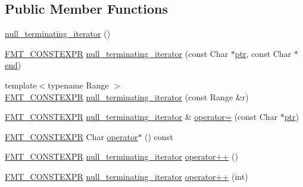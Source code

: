 \subsection*{Public Member Functions}
\begin{DoxyCompactItemize}
\item 
\hyperlink{classinternal_1_1null__terminating__iterator_a2c85bbc62dfa178fbe579df6933a70c4}{null\+\_\+terminating\+\_\+iterator} ()
\item 
\hyperlink{core_8h_a69201cb276383873487bf68b4ef8b4cd}{F\+M\+T\+\_\+\+C\+O\+N\+S\+T\+E\+X\+PR} \hyperlink{classinternal_1_1null__terminating__iterator_ab425ad7f2b63584fe73ceb38535f434c}{null\+\_\+terminating\+\_\+iterator} (const Char $\ast$\hyperlink{format_8h_ae6bfbee71e8bd00280b2d936f93f7b88}{ptr}, const Char $\ast$\hyperlink{namespaceinternal_a94820de1710dc8038fa6f188adfe299b}{end})
\item 
{\footnotesize template$<$typename Range $>$ }\\\hyperlink{core_8h_a69201cb276383873487bf68b4ef8b4cd}{F\+M\+T\+\_\+\+C\+O\+N\+S\+T\+E\+X\+PR} \hyperlink{classinternal_1_1null__terminating__iterator_a791a9850a8ccc184bb925f84ccaafb5e}{null\+\_\+terminating\+\_\+iterator} (const Range \&r)
\item 
\hyperlink{core_8h_a69201cb276383873487bf68b4ef8b4cd}{F\+M\+T\+\_\+\+C\+O\+N\+S\+T\+E\+X\+PR} \hyperlink{classinternal_1_1null__terminating__iterator}{null\+\_\+terminating\+\_\+iterator} \& \hyperlink{classinternal_1_1null__terminating__iterator_a91b88c0a6cbe8b2857227e0536153324}{operator=} (const Char $\ast$\hyperlink{format_8h_ae6bfbee71e8bd00280b2d936f93f7b88}{ptr})
\item 
\hyperlink{core_8h_a69201cb276383873487bf68b4ef8b4cd}{F\+M\+T\+\_\+\+C\+O\+N\+S\+T\+E\+X\+PR} Char \hyperlink{classinternal_1_1null__terminating__iterator_ae26d5d8b609971417570b696bc8caa47}{operator$\ast$} () const
\item 
\hyperlink{core_8h_a69201cb276383873487bf68b4ef8b4cd}{F\+M\+T\+\_\+\+C\+O\+N\+S\+T\+E\+X\+PR} \hyperlink{classinternal_1_1null__terminating__iterator}{null\+\_\+terminating\+\_\+iterator} \hyperlink{classinternal_1_1null__terminating__iterator_aa191ed6b74135576631425612bdfe258}{operator++} ()
\item 
\hyperlink{core_8h_a69201cb276383873487bf68b4ef8b4cd}{F\+M\+T\+\_\+\+C\+O\+N\+S\+T\+E\+X\+PR} \hyperlink{classinternal_1_1null__terminating__iterator}{null\+\_\+terminating\+\_\+iterator} \hyperlink{classinternal_1_1null__terminating__iterator_afc2f529ea18a6aea67361213ee48a74d}{operator++} (int)

\end{DoxyCompactItemize}
